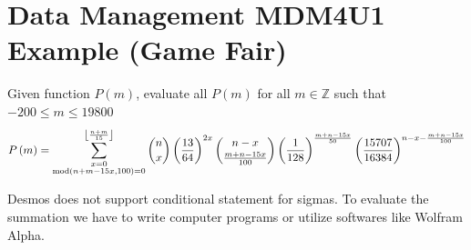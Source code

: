 \documentclass{article}
\begin{document}
\pagebreak
\section{Data Management MDM4U1 Example (Game Fair)}
\begin{custom-big}
Given function $P(m)$, evaluate all $P(m)$ for all $m\in\mathbb{Z}$ such that $-200\leq m\leq 19800$
\[P\left(m\right)=\sum_{\substack{x=0\\ \operatorname{mod}(n+m-15x,100)=0}}^{\left\lfloor \frac{n+m}{15} \right\rfloor}{n\choose x}\left(\frac{13}{64}\right)^{2x}{n-x\choose \frac{m+n-15x}{100}}\left(\frac{1}{128}\right)^{\frac{m+n-15x}{50}}\left(\frac{15707}{16384}\right)^{n-x-\frac{m+n-15x}{100}}\]


\end{custom-big}
Desmos does not support conditional statement for sigmas. To evaluate the summation we have to write computer programs or utilize softwares like Wolfram Alpha.
\medskip
\end{document}
